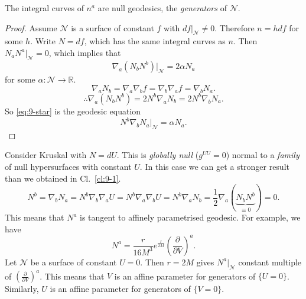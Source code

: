 
\begin{claim}
  \label{cl:9-1}
  The integral curves of $n^{a}$ are null geodesics, the \emph{generators} of $\mathcal{N}$.
\end{claim}
\begin{proof}
  Assume $\mathcal{N}$ is a surface of constant $f$ with $df\rvert_\mathcal{N} \neq 0$. Therefore $n = h df$ for some $h$.
  Write $N = df$, which has the same integral curves as $n$.
  Then $N_a N^a \rvert_{\mathcal{N}} = 0$, which implies that 
  \begin{equation}
    \label{eq:9-star}
    \nabla_a (N_b N^b) \rvert_{\mathcal{N}} = 2 \alpha N_a
  \end{equation} 
  for some $\alpha \colon \mathcal{N} \to \mathbb{R}$.
  \begin{equation}
    \nabla_a N_b = \nabla_a \nabla_b f = \nabla_b \nabla_a f = \nabla_b N_a.
  \end{equation}
  \begin{equation}
    \therefore \nabla_a (N_b N^{b}) = 2 N^{b} \nabla_a N_b = 2 N^{b} \nabla_b N_a.
  \end{equation}
  So \eqref{eq:9-star} is the geodesic equation 
  \begin{equation}
    N^{b} \nabla_b N_a \rvert_\mathcal{N} = \alpha N_a.
  \end{equation}
\end{proof}

\begin{example}[]
  Consider Kruskal with $N = dU$. This is \emph{globally null} ($g^{UU} = 0$) normal to a \emph{family} of null hypersurfaces with constant $U$.
  In this case we can get a stronger result than we obtained in Cl.~\ref{cl:9-1}.
  \begin{equation}
    N^{b} = \nabla_b N_a = N^{b} \nabla_b \nabla_a U = N^{b} \nabla_a \nabla_b U = N^{b} \nabla_a N_b = \frac{1}{2} \nabla_a (\underbrace{N_b N^b}_{\equiv 0}) = 0.
  \end{equation}
  This means that $N^a$ is tangent to affinely parametrised geodesic. For example, we have
  \begin{equation}
    N^a =  \frac{r}{16 M^3} e^{\frac{r}{2M}} \left( \frac{\partial }{\partial V} \right)^a.
  \end{equation}
  Let $\mathcal{N}$ be a surface of constant $U = 0$. Then $r = 2M$ gives $N^a\rvert_{\mathcal{N}}$ constant multiple of $(\frac{\partial}{\partial V})^a$.
  This means that $V$ is an affine parameter for generators of $\{U = 0\}$. Similarly, $U$ is an affine parameter for generators of $\{V = 0\}$.
\end{example}

